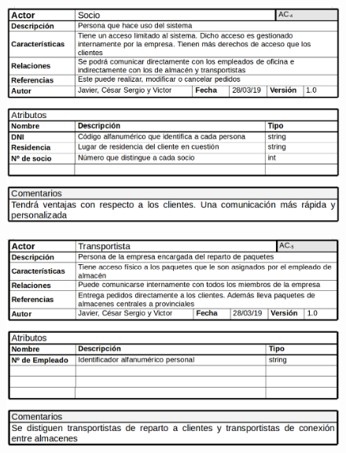 \begin{figure}[H]
	\centering
	\includegraphics[width=16cm]{20}
\end{figure}
\begin{figure}[H]
	\centering
	\includegraphics[width=16cm]{21}
\end{figure}
\newpage

